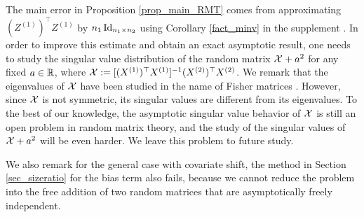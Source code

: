 \begin{remark}
The main error in Proposition \ref{prop_main_RMT} comes from approximating $(Z^{(1)})^\top Z^{(1)}$ by $n_1\id_{n_1\times n_2}$ using Corollary \ref{fact_minv} in the supplement \cite{MTL_suppl}. In order to improve this estimate and obtain an exact asymptotic result, one needs to study the singular value distribution of the  random matrix $\cal X + a^2$ for any fixed $a\in \R$, where $\cal X:=[(X^{(1)})^{\top}X^{(1)}]^{-1}(X^{(2)})^{\top}X^{(2)}$. We remark that the eigenvalues of $\cal X$ have been studied in the name of Fisher matrices \cite{Fmatrix}. However, since $\cal X$ is not symmetric, its singular values are different from its eigenvalues. To the best of our knowledge, the asymptotic singular value behavior of $\cal X$ is still an open problem in random matrix theory, and the study of the singular values of $\cal X + a^2$ will be even harder. We leave this problem to future study.

We also remark for the general case with covariate shift, the method in Section \ref{sec_sizeratio} for the bias term also fails, because we cannot reduce the problem into the free addition of two random matrices that are asymptotically freely independent.
\end{remark}

